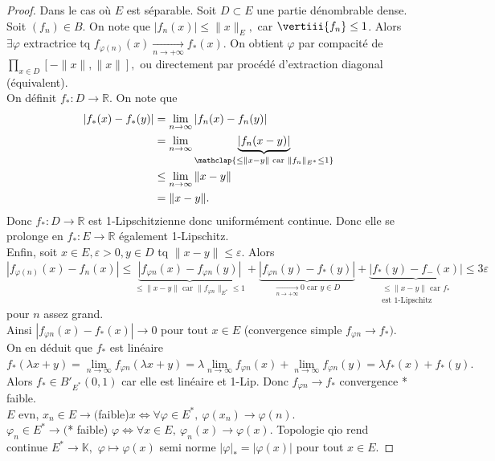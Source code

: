 \begin{proof}
    Dans le cas où $E$ est séparable. Soit $D\subset E$ une partie dénombrable dense. Soit $(f_n)\in B.$ On note que $|f_n(x)| \le \|x\|_E,$ car $\vertiii{f_n}\le 1$. Alors $\exists \varphi $ extractrice tq $f_{\varphi (n)}(x)\underset{n\to +\infty}{\longrightarrow} f_*(x)$. On obtient $\varphi $ par compacité de $\prod\limits_{x\in D}^{} [-\|x\|,\|x\|] ,$ ou directement par procédé d'extraction diagonal (équivalent).\\
    On définit $f_*:D\to \mathbb{R} .$ On note que
    \begin{align*}
        |f_*(x)-f_*(y)| &=\lim\limits_{n \to \infty} |f_n(x)-f_n(y)| \\
                        &=\lim\limits_{n \to \infty} \underbrace{|f_n(x-y)|}_{\mathclap{\le \|x-y\| \text{ car } \|f_n\|_{E^*}\le 1}}\\
                        &\le \lim\limits_{n \to \infty} \|x-y\|\\
                        &=\|x-y\|
    .\end{align*}
    Donc $f_*:D\to \mathbb{R} $ est 1-Lipschitzienne donc uniformément continue. Donc elle se prolonge en $f_*:E\to \mathbb{R} $ également 1-Lipschitz.\\
    Enfin, soit $x\in E, \varepsilon >0, y\in D$ tq $\|x-y\|\le \varepsilon .$ Alors $|f_{\varphi (n)}(x)-f_n(x)| \le \underbrace{|f_{\varphi n}(x)-f_{\varphi n}(y)|}_{\le \|x-y\| \text{ car } \|f_{\varphi n}\|_{E^*}\le 1} + \underbrace{|f_{\varphi n}(y)-f_*(y)|}_{\underset{n\to +\infty}{\longrightarrow} 0 \text{ car }y\in D} +\underbrace{|f_*(y)-f_-(x)| }_{\substack{\le \|x-y\|\text{ car }f_*\\\text{est 1-Lipschitz}}}\le 3\varepsilon $ pour $n$ assez grand.\\
    Ainsi $|f_{\varphi n}(x)-f_*(x)| \to 0$ pour tout $x\in E$ (convergence simple $f_{\varphi n}\to f_*)$. On en déduit que $f_*$ est linéaire $f_*(\lambda x+y)=\lim\limits_{n \to \infty} f_{\varphi n}(\lambda x+y)=\lambda \lim\limits_{n \to \infty} f_{\varphi n}(x)+\lim\limits_{n \to \infty} f_{\varphi n}(y)=\lambda f_*(x)+f_*(y).$ Alors $f_*\in B'_{E^*}(0,1)$ car elle est linéaire et 1-Lip. Donc $f_{\varphi n}\to f_*$ convergence * faible.\\
    $E$ evn, $x_{n}\in E\to ($faible)$x\Leftrightarrow \forall \varphi \in E^*,\ \varphi (x_{n})\to \varphi (n).$\\
    $\varphi _n\in E^*\to ($* faible) $\varphi \Leftrightarrow \forall x\in E,\ \varphi _n(x)\to \varphi (x). $ Topologie qio rend continue $E^*\to \mathbb{K},$ $\varphi \mapsto \varphi (x)$ semi norme $|\varphi | _*=|\varphi (x)| $  pour tout $x\in E.$
\end{proof}

